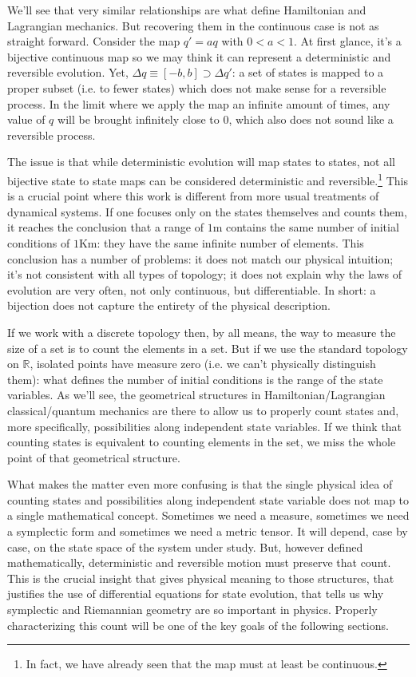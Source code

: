 \documentclass[smallextended]{svjour3}
\numberwithin{equation}{section}
\theoremstyle{definition}
\begin{document}
We'll see that very similar relationships are what define Hamiltonian and Lagrangian mechanics. But recovering them in the continuous case is not as straight forward. Consider the map $q'=aq$ with $0<a<1$. At first glance, it's a bijective continuous map so we may think it can represent a deterministic and reversible evolution. Yet, $\Delta q \equiv [-b, b] \supset \Delta q'$: a set of states is mapped to a proper subset (i.e. to fewer states) which does not make sense for a reversible process. In the limit where we apply the map an infinite amount of times, any value of $q$ will be brought infinitely close to $0$, which also does not sound like a reversible process.

The issue is that while deterministic evolution will map states to states, not all bijective state to state maps can be considered deterministic and reversible.\footnote{In fact, we have already seen that the map must at least be continuous.} This is a crucial point where this work is different from more usual treatments of dynamical systems. If one focuses only on the states themselves and counts them, it reaches the conclusion that a range of $1$m contains the same number of initial conditions of $1$Km: they have the same infinite number of elements. This conclusion has a number of problems: it does not match our physical intuition; it's not consistent with all types of topology; it does not explain why the laws of evolution are very often, not only continuous, but differentiable. In short: a bijection does not capture the entirety of the physical description.

If we work with a discrete topology then, by all means, the way to measure the size of a set is to count the elements in a set. But if we use the standard topology on $\mathbb{R}$, isolated points have measure zero (i.e. we can't physically distinguish them): what defines the number of initial conditions is the range of the state variables. As we'll see, the geometrical structures in Hamiltonian/Lagrangian classical/quantum mechanics are there to allow us to properly count states and, more specifically, possibilities along independent state variables. If we think that counting states is equivalent to counting elements in the set, we miss the whole point of that geometrical structure.

What makes the matter even more confusing is that the single physical idea of counting states and possibilities along independent state variable does not map to a single mathematical concept. Sometimes we need a measure, sometimes we need a symplectic form and sometimes we need a metric tensor. It will depend, case by case, on the state space of the system under study. But, however defined mathematically, deterministic and reversible motion must preserve that count. This is the crucial insight that gives physical meaning to those structures, that justifies the use of differential equations for state evolution, that tells us why symplectic and Riemannian geometry are so important in physics. Properly characterizing this count will be one of the key goals of the following sections.
\end{document}
